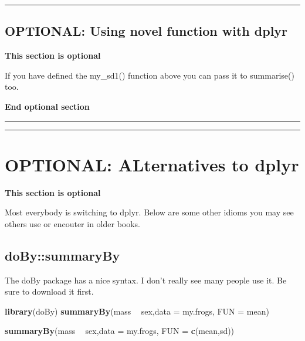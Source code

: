 \documentclass[]{book}
\newenvironment{Shaded}{\begin{snugshade}}{\end{snugshade}}
\newcommand{\KeywordTok}[1]{\textcolor[rgb]{0.13,0.29,0.53}{\textbf{#1}}}
\newcommand{\DataTypeTok}[1]{\textcolor[rgb]{0.13,0.29,0.53}{#1}}
\newcommand{\StringTok}[1]{\textcolor[rgb]{0.31,0.60,0.02}{#1}}
\newcommand{\OperatorTok}[1]{\textcolor[rgb]{0.81,0.36,0.00}{\textbf{#1}}}
\newcommand{\NormalTok}[1]{#1}
\theoremstyle{definition}
\theoremstyle{definition}
\theoremstyle{definition}
\theoremstyle{remark}
\begin{document}
\begin{center}\rule{0.5\linewidth}{\linethickness}\end{center}

\subsection{OPTIONAL: Using novel function with
dplyr}\label{optional-using-novel-function-with-dplyr}

\textbf{This section is optional}

If you have defined the my\_sd1() function above you can pass it to
summarise() too.

\begin{Shaded}
\end{Shaded}

\textbf{End optional section}

\begin{center}\rule{0.5\linewidth}{\linethickness}\end{center}

\begin{center}\rule{0.5\linewidth}{\linethickness}\end{center}

\section{OPTIONAL: ALternatives to
dplyr}\label{optional-alternatives-to-dplyr}

\textbf{This section is optional}

Most everybody is switching to dplyr. Below are some other idioms you
may see others use or encouter in older books.

\subsection{doBy::summaryBy}\label{dobysummaryby}

The doBy package has a nice syntax. I don't really see many people use
it. Be sure to download it first.

\begin{Shaded}
\begin{Highlighting}[]
\KeywordTok{library}\NormalTok{(doBy)}
\KeywordTok{summaryBy}\NormalTok{(mass }\OperatorTok{~}\StringTok{ }\NormalTok{sex,}\DataTypeTok{data =}\NormalTok{ my.frogs, }\DataTypeTok{FUN =}\NormalTok{ mean)}

\KeywordTok{summaryBy}\NormalTok{(mass }\OperatorTok{~}\StringTok{ }\NormalTok{sex,}\DataTypeTok{data =}\NormalTok{ my.frogs, }\DataTypeTok{FUN =} \KeywordTok{c}\NormalTok{(mean,sd))}
\end{Highlighting}
\end{Shaded}
\end{document}
